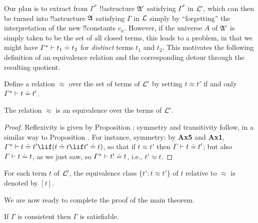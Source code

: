 \documentclass[../../include/open-logic-section]{subfiles}
\begin{document}
Our plan is to extract from $\Gamma^*$ !!a{structure} $\mathfrak A'$
satisfying $\Gamma^*$ in $\mathcal L'$, which can then be turned into
!!a{structure} $\mathfrak A$ satisfying $\Gamma$ in $\mathcal L$ simply
by ``forgetting'' the interpretation of the new !!{constant}s
$c_n$. However, if the universe $A$ of $\mathfrak A'$ is simply taken
to be the set of all closed terms, this leads to a problem, in that we
might have $\Gamma^* \Proves t_1 \doteq t_2$ for \emph{distinct} terms
$t_1$ and $t_2$. This motivates the following definition of an
equivalence relation and the corresponding detour through the
resulting quotient.

\begin{defn}
  Define a relation $\approx$ over the set of terms of $\mathcal L'$
  by setting $t \approx t'$ if and only $\Gamma^* \Proves t \doteq
  t'$. 
\end{defn}

\begin{defn}
  The relation $\approx$ is an equivalence over the terms of
  $\mathcal L'$.
\end{defn}

\begin{proof}
  Reflexivity is given by Proposition ; symmetry and
  transitivity follow, in a similar way to Proposition
  . For instance, symmetry: by \textbf{Ax5} and
  \textbf{Ax1}, $\Gamma^* \Proves t \doteq t' \lif (t \doteq t
  \lif t' \doteq t)$, so that if $t \approx t'$ then $\Gamma \Proves
  t \doteq t'$; but also $\Gamma \Proves t \doteq t$, as we just saw,
  so $\Gamma^* \Proves t' \doteq t$, i.e., $t'\approx t$. 
\end{proof}

\begin{defn}
  For each term $t$ of $\mathcal L'$, the equivalence class $\{ t' :
  t \approx t' \}$ of $t$ relative to $\approx$ is denoted by $[t]$.
\end{defn}

We are now ready to complete the proof of the main theorem. 

\begin{thm}
  If $\Gamma$ is consistent then $\Gamma$ is satisfiable. 
\end{thm}
\end{document}
